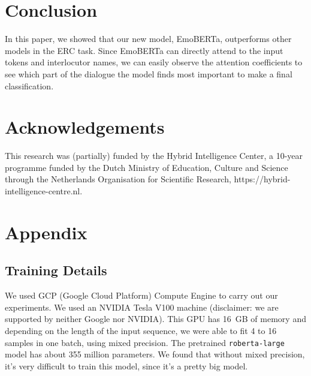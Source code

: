 \documentclass[11pt]{article}
\makeatletter
\newcommand{\highlight@DoHighlight}{
    \fill [outer sep = -15pt, inner sep = 0pt, color=black]
          () rectangle () ;
  }
\newcommand{\highlight@BeginHighlight}{
    \coordinate (begin highlight) at (0,0) ;
  }
\newcommand{\highlight@EndHighlight}{
    \coordinate (end highlight) at (0,0) ;
  }
\newlength{\item@width}
\DeclareRobustCommand*\anonymize{\SOUL@setup
    \def\SOUL@preamble{\begin{tikzpicture}[overlay, remember picture]
        \highlight@BeginHighlight
        \highlight@EndHighlight
      \end{tikzpicture}}\def\SOUL@postamble{\begin{tikzpicture}[overlay, remember picture]
        \highlight@EndHighlight
        \highlight@DoHighlight
      \end{tikzpicture}}\def\SOUL@everyhyphen{\discretionary{\SOUL@setkern\SOUL@hyphkern
        \SOUL@sethyphenchar
        \tikz[overlay, remember picture] \highlight@EndHighlight ;}{}{\SOUL@setkern\SOUL@charkern
      }}\def\SOUL@everyexhyphen##1{\SOUL@setkern\SOUL@hyphkern
      \settowidth{\item@width}{##1}\makebox[\item@width]{}\discretionary{\tikz[overlay, remember picture] \highlight@EndHighlight ;}{}{\SOUL@setkern\SOUL@charkern
      }}\def\SOUL@everysyllable{\begin{tikzpicture}[overlay, remember picture]
        \path let \p0 = (begin highlight), \p1 = (0,0) in \pgfextra
          \global\highlight@previous=\y0
          \global\highlight@current =\y1
        \endpgfextra (0,0) ;
        \ifdim\highlight@current < \highlight@previous
          \highlight@DoHighlight
          \highlight@BeginHighlight
        \fi
      \end{tikzpicture}\settowidth{\item@width}{\the\SOUL@syllable}\makebox[\item@width]{}\tikz[overlay, remember picture] \highlight@EndHighlight ;}\SOUL@
  }
\newcommand{\anonymize}[1]{#1}
\makeatother
\begin{document}



\section{Conclusion}
\label{sec:conclusions}

In this paper, we showed that our new model, EmoBERTa, outperforms other models in the ERC task. Since EmoBERTa can directly attend to the input tokens and interlocutor names, we can easily observe the attention coefficients to see which part of the dialogue the model finds most important to make a final classification.

\section*{Acknowledgements}

\anonymize{This research was (partially) funded by the Hybrid Intelligence Center, a 10-year programme funded by the Dutch Ministry of Education, Culture and Science through the Netherlands Organisation for Scientific Research, https://hybrid-intelligence-centre.nl.}




\clearpage
\appendix

\section{Appendix}
\label{sec:appendix}

\subsection{Training Details} \label{sec:training-details}

We used GCP (Google Cloud Platform) Compute Engine to carry out our experiments. We used an NVIDIA Tesla V100 machine (disclaimer: we are supported by neither Google nor NVIDIA). This GPU has 16 GB of memory and depending on the length of the input sequence, we were able to fit 4 to 16 samples in one batch, using mixed precision. The pretrained \texttt{roberta-large} model has about 355 million parameters. We found that without mixed precision, it's very difficult to train this model, since it's a pretty big model.
\end{document}

